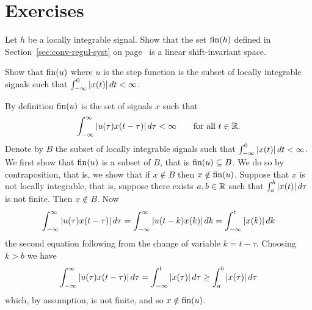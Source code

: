 \section*{Exercises}

\begin{excersizelist}


\item \label{exer:finhlinshiftinv}  Let $h$ be a locally integrable signal.  Show that the set $\operatorname{fin}(h)$ defined in Section~\ref{sec:conv-regul-syst} on page~\pageref{sec:conv-regul-syst} is a linear shift-invariant space.

\item Show that $\operatorname{fin}(u)$ where $u$ is the step function is the subset of locally integrable signals such that $\int_{-\infty}^0\left\vert x(t) \right\vert dt < \infty$.
\begin{solution}
By definition $\operatorname{fin}(u)$ is the set of signals $x$ such that
\[
\int_{-\infty}^{\infty} \left\vert u(\tau) x(t - \tau) \right\vert d\tau < \infty \qquad \text{for all $t \in {\mathbb R}$}.
\]
Denote by $B$ the subset of locally integrable signals such that $\int_{-\infty}^0\left\vert x(t) \right\vert dt < \infty$.  We first show that $\operatorname{fin}(u)$ is a subset of $B$, that is $\operatorname{fin}(u) \subseteq B$.  We do so by contraposition, that is, we show that if $x \notin B$ then $x \notin \operatorname{fin}(u)$.  Suppose that $x$ is not locally integrable, that is, suppose there exists $a, b \in {\mathbb R}$ such that $\int_{a}^{b} \left\vert x(t) \right\vert d\tau$ is not finite.  Then $x \notin B$.  Now
\[
\int_{-\infty}^{\infty} \left\vert u(\tau) x(t - \tau) \right\vert d\tau = \int_{-\infty}^{\infty} \left\vert u(t - k) x(k) \right\vert dk = \int_{-\infty}^{t} \left\vert x(k) \right\vert dk
\]
the second equation following from the change of variable $k = t - \tau$.  Choosing $k > b$ we have
\[
\int_{-\infty}^{\infty} \left\vert u(\tau) x(t - \tau) \right\vert d\tau = \int_{-\infty}^{t} \left\vert x(\tau) \right\vert d\tau \geq \int_{a}^{b} \left\vert x(\tau) \right\vert d\tau
\]
which, by assumption, is not finite, and so $x \notin \operatorname{fin}(u)$.  


\end{solution}
\end{excersizelist}
